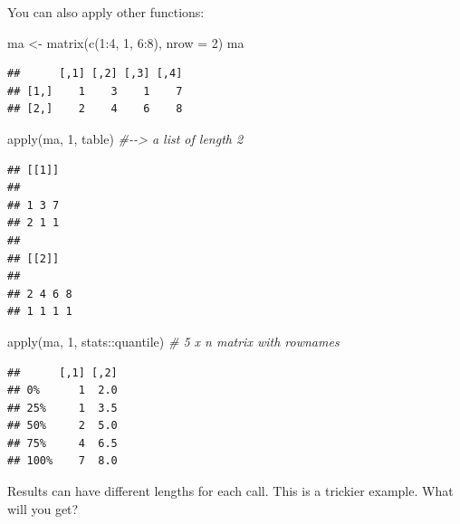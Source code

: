 \documentclass[
  12pt,
]{krantz}
\makeatletter
\newenvironment{Shaded}{\begin{snugshade}}{\end{snugshade}}
\newcommand{\AttributeTok}[1]{\textcolor[rgb]{0.61,0.61,0.61}{#1}}
\newcommand{\CommentTok}[1]{\textcolor[rgb]{0.37,0.37,0.37}{\textit{#1}}}
\newcommand{\DecValTok}[1]{\textcolor[rgb]{0.06,0.06,0.06}{#1}}
\newcommand{\FunctionTok}[1]{\textcolor[rgb]{0,0,0}{#1}}
\newcommand{\NormalTok}[1]{#1}
\newcommand{\OtherTok}[1]{\textcolor[rgb]{0.37,0.37,0.37}{#1}}
\newcommand{\SpecialCharTok}[1]{\textcolor[rgb]{0,0,0}{#1}}
\newenvironment{kframe}{%
\medskip{}
\setlength{\fboxsep}{.8em}
 \def\at@end@of@kframe{}%
 \ifinner\ifhmode%
  \def\at@end@of@kframe{\end{minipage}}%
  \begin{minipage}{\columnwidth}%
 \fi\fi%
 \def\FrameCommand##1{\hskip\@totalleftmargin \hskip-\fboxsep
 \colorbox{shadecolor}{##1}\hskip-\fboxsep
     \hskip-\linewidth \hskip-\@totalleftmargin \hskip\columnwidth}%
 \MakeFramed {\advance\hsize-\width
   \@totalleftmargin\z@ \linewidth\hsize
   \@setminipage}}%
 {\par\unskip\endMakeFramed%
 \at@end@of@kframe}
\renewenvironment{Shaded}{\begin{kframe}}{\end{kframe}}
\makeatother
\begin{document}
You can also apply other functions:

\begin{Shaded}
\begin{Highlighting}[]
\NormalTok{ma }\OtherTok{\textless{}{-}} \FunctionTok{matrix}\NormalTok{(}\FunctionTok{c}\NormalTok{(}\DecValTok{1}\SpecialCharTok{:}\DecValTok{4}\NormalTok{, }\DecValTok{1}\NormalTok{, }\DecValTok{6}\SpecialCharTok{:}\DecValTok{8}\NormalTok{), }\AttributeTok{nrow =} \DecValTok{2}\NormalTok{)}
\NormalTok{ma}
\end{Highlighting}
\end{Shaded}

\begin{verbatim}
##      [,1] [,2] [,3] [,4]
## [1,]    1    3    1    7
## [2,]    2    4    6    8
\end{verbatim}

\begin{Shaded}
\begin{Highlighting}[]
\FunctionTok{apply}\NormalTok{(ma, }\DecValTok{1}\NormalTok{, table)  }\CommentTok{\#{-}{-}\textgreater{} a list of length 2}
\end{Highlighting}
\end{Shaded}

\begin{verbatim}
## [[1]]
## 
## 1 3 7 
## 2 1 1 
## 
## [[2]]
## 
## 2 4 6 8 
## 1 1 1 1
\end{verbatim}

\begin{Shaded}
\begin{Highlighting}[]
\FunctionTok{apply}\NormalTok{(ma, }\DecValTok{1}\NormalTok{, stats}\SpecialCharTok{::}\NormalTok{quantile) }\CommentTok{\# 5 x n matrix with rownames}
\end{Highlighting}
\end{Shaded}

\begin{verbatim}
##      [,1] [,2]
## 0%      1  2.0
## 25%     1  3.5
## 50%     2  5.0
## 75%     4  6.5
## 100%    7  8.0
\end{verbatim}

Results can have different lengths for each call. This is a trickier example. What will you get?
\end{document}
